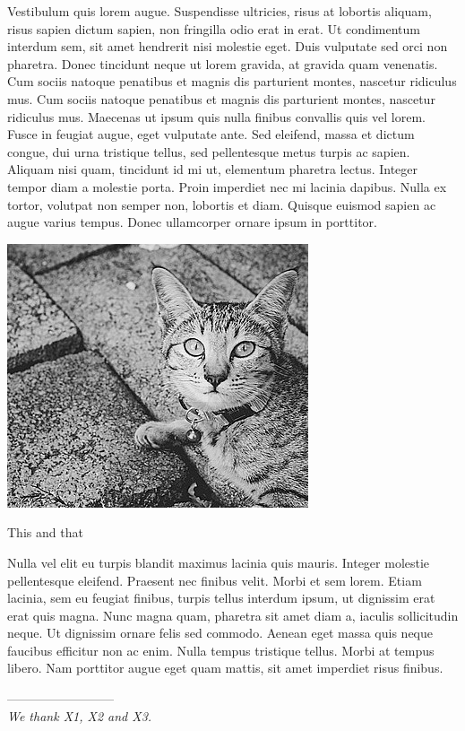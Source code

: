 \documentclass[a4paper,justified]{tufte-handout}
\begin{document}
Vestibulum quis lorem augue. Suspendisse ultricies, risus at lobortis aliquam, risus sapien dictum sapien, non fringilla odio erat in erat. Ut condimentum interdum sem, sit amet hendrerit nisi molestie eget. Duis vulputate sed orci non pharetra. Donec tincidunt neque ut lorem gravida, at gravida quam venenatis. Cum sociis natoque penatibus et magnis dis parturient montes, nascetur ridiculus mus. Cum sociis natoque penatibus et magnis dis parturient montes, nascetur ridiculus mus. Maecenas ut ipsum quis nulla finibus convallis quis vel lorem. Fusce in feugiat augue, eget vulputate ante. Sed eleifend, massa et dictum congue, dui urna tristique tellus, sed pellentesque metus turpis ac sapien. Aliquam nisi quam, tincidunt id mi ut, elementum pharetra lectus. Integer tempor diam a molestie porta. Proin imperdiet nec mi lacinia dapibus. Nulla ex tortor, volutpat non semper non, lobortis et diam. Quisque euismod sapien ac augue varius tempus. Donec ullamcorper ornare ipsum in porttitor.

\begin{marginfigure}
  \includegraphics[trim=0cm 0cm 0cm 0cm, clip=true]{./figures/cat.jpg}
  \caption[Short version of title that appears in the list of figures]{This and that}
\end{marginfigure} 

Nulla vel elit eu turpis blandit maximus lacinia quis mauris. Integer molestie pellentesque eleifend. Praesent nec finibus velit. Morbi et sem lorem. Etiam lacinia, sem eu feugiat finibus, turpis tellus interdum ipsum, ut dignissim erat erat quis magna. Nunc magna quam, pharetra sit amet diam a, iaculis sollicitudin neque. Ut dignissim ornare felis sed commodo. Aenean eget massa quis neque faucibus efficitur non ac enim. Nulla tempus tristique tellus. Morbi at tempus libero. Nam porttitor augue eget quam mattis, sit amet imperdiet risus finibus.
 

\vspace{1cm}
--------------------------\\
\textit{We thank X1, X2 and X3.}
\end{document}
